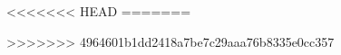 \newcommand{\mOmega}{\mathrm{\Omega}}
\newcommand{\mPhi}{\mathrm{\Phi}}
\newcommand{\mGamma}{\mathrm{\Gamma}}

\newcommand{\union}{\cup}
\newcommand{\intersection}{\cap}

\newcommand{\iid}{\stackrel{iid}{\sim}}
\newcommand{\ind}{\stackrel{ind}{\sim}}

<<<<<<< HEAD
=======
\newcommand{\I}{\mathrm{I}}

>>>>>>> 4964601b1dd2418a7be7c29aaa76b8335e0cc357
\newcommand{\pvalue}{$p$-value}